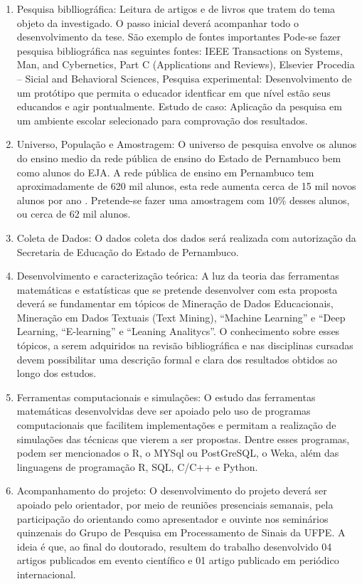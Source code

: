 \documentclass[
	12pt,				%
	openright,			%
	oneside,
	a4paper,			%
	english,			%
	french,				%
	spanish,			%
	brazil,				%
	]{abntex2}
\begin{document}
\begin{enumerate}
\item
Pesquisa biblliográfica: Leitura de artigos e de livros que tratem do tema objeto da investigado. O passo inicial deverá acompanhar todo o desenvolvimento da tese. São exemplo de fontes importantes Pode-se fazer pesquisa bibliográfica nas seguintes fontes: IEEE Transactions on Systems, Man, and Cybernetics, Part C (Applications and Reviews), Elsevier Procedia -- Sicial and Behavioral Sciences,  
Pesquisa experimental: Desenvolvimento de um protótipo que permita o educador identficar em que nível estão seus educandos e agir pontualmente.
Estudo de caso: Aplicação da pesquisa em um ambiente escolar selecionado para comprovação dos resultados.
\item
	Universo, População e Amostragem:
O universo de pesquisa envolve os alunos do ensino medio da rede pública de ensino do Estado de Pernambuco bem como alunos do EJA. A rede pública de ensino em Pernambuco tem aproximadamente de 620 mil alunos, esta rede aumenta cerca de 15 mil novos alunos por ano  \cite{alunosEstado.2016}. Pretende-se fazer uma amostragem com 10\% desses alunos, ou cerca de 62 mil alunos. 
\item
	Coleta de Dados:
O dados coleta dos dados será realizada com autorização da Secretaria de Educação do Estado de Pernambuco.
\item
	Desenvolvimento e caracterização teórica:
A luz da teoria das ferramentas matemáticas e estatísticas que se pretende desenvolver com esta proposta deverá se fundamentar em tópicos de Mineração de Dados Educacionais, Mineração em Dados Textuais (Text Mining), ``Machine Learning'' e ``Deep Learning, ``E-learning'' e ``Leaning Analitycs''. O conhecimento sobre esses tópicos, a serem adquiridos na revisão bibliográfica e nas disciplinas cursadas devem possibilitar uma descrição formal e clara dos resultados obtidos ao longo dos estudos.
\item
	Ferramentas computacionais e simulações:
O estudo das ferramentas matemáticas desenvolvidas deve ser apoiado pelo uso de programas computacionais que facilitem implementações e permitam a realização de simulações das técnicas que vierem a ser propostas. Dentre esses programas, podem ser mencionados o R, o MYSql ou PostGreSQL, o Weka, além das linguagens de programação R, SQL, C/C++ e Python.
\item
	Acompanhamento do projeto:
O desenvolvimento do projeto deverá ser apoiado pelo orientador, por meio de reuniões presenciais semanais, pela participação do orientando como apresentador e ouvinte nos seminários quinzenais do Grupo de Pesquisa em Processamento de Sinais da UFPE. A ideia é que, ao final do doutorado, resultem do trabalho desenvolvido 04 artigos publicados em evento científico e 01 artigo publicado em periódico internacional.

\end{enumerate}
\end{document}

